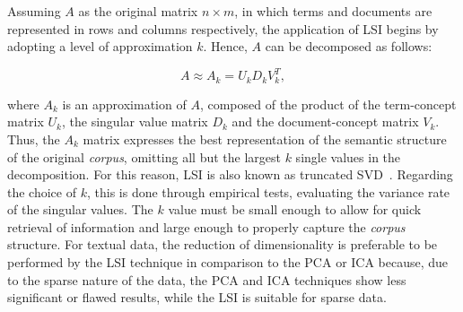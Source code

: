 \documentclass{ieeeaccess}
\begin{document}
Assuming $ A $ as the original matrix $ n \times m $, in which terms and documents are represented in rows and columns respectively, the application of LSI begins by adopting a level of approximation $ k $. Hence, $ A $ can be decomposed as follows:


\begin{equation}
    A\approx A_{k} = U_{k} D_{k} V_{k}^{T},
    \label{eq:lsi}
\end{equation}


\noindent where $ A_ {k} $ is an approximation of $ A $, composed of the product of the term-concept matrix $ U_ {k} $, the singular value matrix $ D_ {k} $ and the document-concept matrix  $ V_ {k} $. Thus, the $ A_ {k} $ matrix expresses the best representation of the semantic structure of the original \textit{corpus}, omitting all but the largest $ k $ single values in the decomposition. For this reason, LSI is also known as truncated SVD~\cite{papadimitriou2000latent, deerwester1990indexing}. Regarding the choice of $ k $, this is done through empirical tests, evaluating the variance rate of the singular values. The $ k $ value must be small enough to allow for quick retrieval of information and large enough to properly capture the \textit{corpus} structure. For textual data, the reduction of dimensionality is preferable to be performed by the LSI technique in comparison to the PCA or ICA because, due to the sparse nature of the data, the PCA and ICA techniques show less significant or flawed results, while the LSI is suitable for sparse data.

\end{document}
